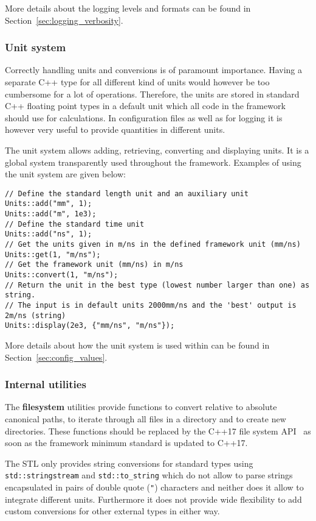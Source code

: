 More details about the logging levels and formats can be found in Section~\ref{sec:logging_verbosity}.

\subsubsection{Unit system}
\label{sec:unit_system}
Correctly handling units and conversions is of paramount importance.
Having a separate C++ type for all different kind of units would however be too cumbersome for a lot of operations.
Therefore, the units are stored in standard C++ floating point types in a default unit which all code in the framework should use for calculations.
In configuration files as well as for logging it is however very useful to provide quantities in different units.

The unit system allows adding, retrieving, converting and displaying units.
It is a global system transparently used throughout the framework.
Examples of using the unit system are given below:
\begin{verbatim}
// Define the standard length unit and an auxiliary unit
Units::add("mm", 1);
Units::add("m", 1e3);
// Define the standard time unit
Units::add("ns", 1);
// Get the units given in m/ns in the defined framework unit (mm/ns)
Units::get(1, "m/ns");
// Get the framework unit (mm/ns) in m/ns
Units::convert(1, "m/ns");
// Return the unit in the best type (lowest number larger than one) as string.
// The input is in default units 2000mm/ns and the 'best' output is 2m/ns (string)
Units::display(2e3, {"mm/ns", "m/ns"});
\end{verbatim}

More details about how the unit system is used within \apsq can be found in Section~\ref{sec:config_values}.

\subsubsection{Internal utilities}
\label{sec:filesystem}
The \textbf{filesystem} utilities provide functions to convert relative to absolute canonical paths, to iterate through all files in a directory and to create new directories.
These functions should be replaced by the C++17 file system API~\cite{cppfilesystem} as soon as the framework minimum standard is updated to C++17.

\label{sec:string_utilities}
The STL only provides string conversions for standard types using \texttt{std::stringstream} and \texttt{std::to\_string} which do not allow to parse strings encapsulated in pairs of double quote (\texttt{"}) characters and neither does it allow to integrate different units.
Furthermore it does not provide wide flexibility to add custom conversions for other external types in either way.

